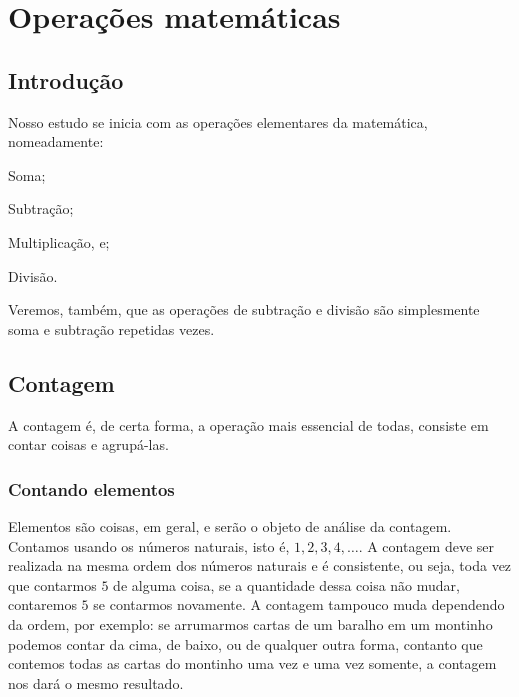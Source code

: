 \chapter{Operações matemáticas}

\section{Introdução}

Nosso estudo se inicia com as operações elementares da matemática, nomeadamente:

\begin{RomanList}
	\item Soma;
	\item Subtração;
	\item Multiplicação, e;
	\item Divisão.
\end{RomanList}

Veremos, também, que as operações de subtração e divisão são simplesmente soma e subtração repetidas vezes.

\section{Contagem}

A contagem é, de certa forma, a operação mais essencial de todas, consiste em contar coisas e agrupá-las.

\subsection{Contando elementos}

Elementos são coisas, em geral, e serão o objeto de análise da contagem. Contamos usando os números naturais, isto é, $ 1,2,3,4,\ldots $. A contagem deve ser realizada na mesma ordem dos números naturais e é consistente, ou seja, toda vez que contarmos $ 5 $ de alguma coisa, se a quantidade dessa coisa não mudar, contaremos $ 5 $ se contarmos novamente. A contagem tampouco muda dependendo da ordem, por exemplo: se arrumarmos cartas de um baralho em um montinho podemos contar da cima, de baixo, ou de qualquer outra forma, contanto que contemos todas as cartas do montinho uma vez e uma vez somente, a contagem nos dará o mesmo resultado.

